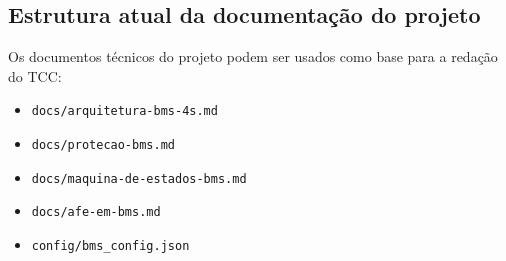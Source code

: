 \documentclass[
  12pt,
  oneside,
  openright,
  a4paper,
  english,
  brazil
]{abntex2}
\begin{document}
\begin{anexosenv}
\partanexos
\chapter{Estrutura atual da documentação do projeto}

Os documentos técnicos do projeto podem ser usados como base para a redação do TCC:

\begin{itemize}
  \item \texttt{docs/arquitetura-bms-4s.md}
  \item \texttt{docs/protecao-bms.md}
  \item \texttt{docs/maquina-de-estados-bms.md}
  \item \texttt{docs/afe-em-bms.md}
  \item \texttt{config/bms\_config.json}
\end{itemize}
\end{anexosenv}

\printindex
\end{document}
